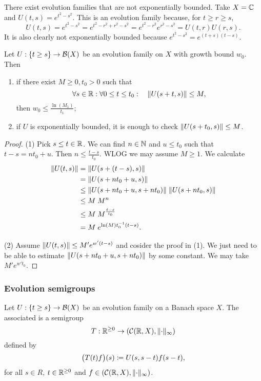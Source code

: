 \begin{example}
There exist evolution families that are not exponentially bounded. Take $X = \mathbb{C}$ and $U(t,s) = e^{t^2 - s^2}$. This is an evolution family because, for $t\geq r\geq s$,
\[ U(t,s) = e^{t^2 - s^2} = e^{t^2 - r^2 + r^2 - s^2} = e^{t^2 - r^2}e^{r^2 - s^2} = U(t,r)U(r,s). \]
It is also clearly not exponentially bounded because $e^{t^2 - s^2} = e^{(t+s)(t-s)}$.
\end{example}

\begin{proposition}
Let $U: \{t\geq s\}\to \operatorname{\mathcal{B}}(X)$ be an evolution family on $X$ with growth bound $w_0$. Then
\begin{enumerate}
\item if there exist $M\geq 0, t_0>0$ such that
\[ \forall s\in\mathbb{R}: \forall 0\leq t \leq t_0: \quad \lVert U(s+t, s)\rVert\leq M, \]
then $w_0\leq \frac{\ln(M_1)}{t_1}$;
\item if $U$ is exponentially bounded, it is enough to check $\lVert U(s+t_0, s)\rVert\leq M$.
\end{enumerate}
\end{proposition}
\begin{proof}
(1) Pick $s\leq t \in \mathbb{R}$. We can find $n\in \mathbb{N}$ and $u\leq t_0$ such that $t-s = nt_0 + u$. Then $n\leq \frac{t-s}{t_0}$. WLOG we may assume $M\geq 1$. We calculate
\begin{align*}
\lVert U(t,s)\rVert &= \lVert U(s+(t-s), s)\rVert \\
&= \lVert U(s+nt_0 + u, s)\rVert \\
&\leq \lVert U(s+nt_0 + u, s+nt_0)\rVert\;\lVert U(s+nt_0, s)\rVert \\
&\leq M\;M^n \\
&\leq M\;M^{\frac{t-s}{t_0}} \\
&= M\;e^{\ln(M)t_0^{-1}(t-s)}.
\end{align*}

(2) Assume $\lVert U(t,s)\rVert \leq M' e^{w'(t-s)}$ and cosider the proof in (1). We just need to be able to estimate $\lVert U(s+nt_0 + u, s+nt_0)\rVert$ by some constant. We may take $M' e^{w't_0}$.
\end{proof}

\subsubsection{Evolution semigroups}
\begin{definition}
Let $U: \{t\geq s\}\to \operatorname{\mathcal{B}}(X)$ be an evolution family on a Banach space $X$. The associated  is a semigroup
\[ T: \mathbb{R}^{\geq 0} \to \left( \operatorname{\mathcal{C}}(\mathbb{R}, X), \lVert\cdot\rVert_\infty \right) \]
defined by
\[ \big(T(t)f\big)(s) \coloneqq U(s,s-t)f(s-t), \]
for all $s\in R$, $t\in\mathbb{R}^{\geq 0}$ and $f\in \left( \operatorname{\mathcal{C}}(\mathbb{R}, X), \lVert\cdot\rVert_\infty \right)$.
\end{definition}

